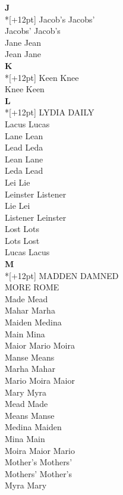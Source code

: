 \vspace{14pt}
\noindent\textbf{\Large J}\\*[+12pt]
Jacob's Jacobs'\\
Jacobs' Jacob's\\
Jane Jean\\
Jean Jane\\

\vspace{14pt}
\noindent\textbf{\Large K}\\*[+12pt]
Keen Knee\\
Knee Keen\\

\vspace{14pt}
\noindent\textbf{\Large L}\\*[+12pt]
LYDIA DAILY\\
Lacus Lucas\\
Lane Lean\\
Lead Leda\\
Lean Lane\\
Leda Lead\\
Lei Lie\\
Leinster Listener\\
Lie Lei\\
Listener Leinster\\
Lost Lots\\
Lots Lost\\
Lucas Lacus\\

\vspace{14pt}
\noindent\textbf{\Large M}\\*[+12pt]
MADDEN DAMNED\\
MORE ROME\\
Made Mead\\
Mahar Marha\\
Maiden Medina\\
Main Mina\\
Maior Mario Moira\\
Manse Means\\
Marha Mahar\\
Mario Moira Maior\\
Mary Myra\\
Mead Made\\
Means Manse\\
Medina Maiden\\
Mina Main\\
Moira Maior Mario\\
Mother's Mothers'\\
Mothers' Mother's\\
Myra Mary\\

